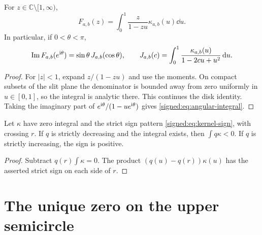 \begin{corollary}\label{signed:cor:stieltjes}
For $z\in\mathbb C\setminus[1,\infty)$,
\begin{equation}\label{signed:eq:stieltjes}
 F_{a,b}(z)=\int_0^1\frac{z}{1-zu}\kappa_{a,b}(u)\dd u.
\end{equation}
In particular, if $0<\theta<\pi$,
\begin{equation}\label{signed:eq:angular-integral}
 \operatorname{Im} F_{a,b}(e^{\mathrm{i}\theta})
 =\sin\theta\,J_{a,b}(\cos\theta),\qquad
 J_{a,b}(c)=\int_0^1\frac{\kappa_{a,b}(u)}{1-2cu+u^2}\,\mathrm d u.
\end{equation}
\end{corollary}
\begin{proof}
For $|z|<1$, expand $z/(1-zu)$ and use the moments. On compact subsets of the slit plane the denominator is bounded away from zero uniformly in $u\in[0,1]$, so the integral is analytic there. This continues the disk identity. Taking the imaginary part of $e^{\mathrm{i}\theta}/(1-ue^{\mathrm{i}\theta})$ gives \eqref{signed:eq:angular-integral}.
\end{proof}

\begin{lemma}\label{signed:lem:sign-test}
Let $\kappa$ have zero integral and the strict sign pattern \eqref{signed:eq:kernel-sign}, with crossing $r$. If $q$ is strictly decreasing and the integral exists, then $\int q\kappa<0$. If $q$ is strictly increasing, the sign is positive.
\end{lemma}
\begin{proof}
Subtract $q(r)\int\kappa=0$. The product $(q(u)-q(r))\kappa(u)$ has the asserted strict sign on each side of $r$.
\end{proof}

\section{The unique zero on the upper semicircle}
\label{signed:sec:zeros}

